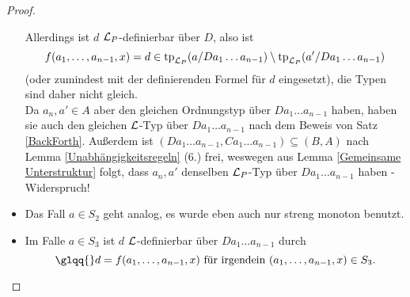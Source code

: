 \begin{proof}
\begin{itemize}
		Allerdings ist $d$ $\mathcal{L}_P$-definierbar über $D$, also ist $$f(a_1,\dots,a_{n-1},x)=d\in\operatorname{tp}_{\mathcal{L}_P}(a/Da_1\dots a_{n-1})\setminus\operatorname{tp}_{\mathcal{L}_P}(a'/Da_1\dots a_{n-1})$$ (oder zumindest mit der definierenden Formel für $d$ eingesetzt), die Typen sind daher nicht gleich.\\
		Da $a_n,a'\in A$ aber den gleichen Ordnungstyp über $Da_1\dots a_{n-1}$ haben, haben sie auch den gleichen $\mathcal{L}$-Typ über $Da_1\dots a_{n-1}$ nach dem Beweis von Satz \ref{BackForth}. Außerdem ist $(Da_1\dots a_{n-1},Ca_1\dots a_{n-1})\subseteq(B,A)$ nach Lemma \ref{Unabhängigkeitsregeln} (6.) frei, weswegen aus Lemma \ref{Gemeinsame Unterstruktur} folgt, dass $a_n,a'$ denselben $\mathcal{L}_P$-Typ über $Da_1\dots a_{n-1}$ haben - Widerspruch!
		\item Das Fall $a\in S_2$ geht analog, es wurde eben auch nur streng monoton benutzt.
		\item Im Falle $a\in S_3$ ist $d$ $\mathcal{L}$-definierbar über $Da_1\dots a_{n-1}$ durch $$\glqq{}d=f(a_1,\dots,a_{n-1},x)\text{ für irgendein }(a_1,\dots,a_{n-1},x)\in S_3.$$
	\end{itemize}
\end{proof}

